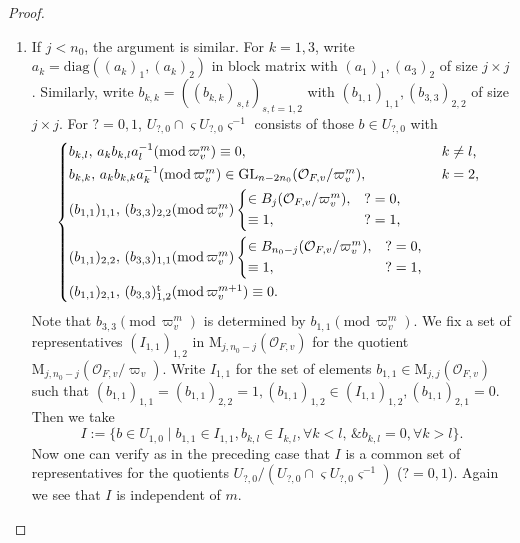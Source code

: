 \documentclass[10pt,a4paper]{amsart}
\begin{document}
\begin{proof}
\begin{enumerate}
			
			\item 
			If
			$j<n_0$,
			the argument is similar.
			For $k=1,3$,
			write
			$a_k=\mathrm{diag}((a_k)_1,(a_k)_2)$ in block matrix
			with
			$(a_1)_1,(a_3)_2$ of size $j\times j$.
			Similarly, write
			$b_{k,k}=((b_{k,k})_{s,t})_{s,t=1,2}$
			with
			$(b_{1,1})_{1,1},
			(b_{3,3})_{2,2}$ of size
			$j\times j$.
			For
			$?=0,1$,
			$U_{?,0}\cap
			\varsigma
			U_{?,0}\varsigma^{-1}$
			consists of those $b\in U_{?,0}$ with
			\[
			\begin{cases*}
				b_{k,l},\,
				a_kb_{k,l}a_l^{-1}		
				(\mathrm{mod}\,\varpi_v^m)
				\equiv
				0,
				&
				$k\neq l$,
				\\
				b_{k,k},\,
				a_kb_{k,k}a_k^{-1}
				(\mathrm{mod}\,\varpi_v^m)
				\in
				\mathrm{GL}_{n-2n_0}(\mathcal{O}_{F,v}/\varpi_v^m),
				&
				$k=2$,
				\\
				(b_{1,1})_{1,1},\,
				(b_{3,3})_{2,2}
				(\mathrm{mod}\,\varpi_v^m)
				\begin{cases*}
					\in
					B_j
					(\mathcal{O}_{F,v}/\varpi_v^m),
					&
					$?=0$,
					\\
					\equiv1,
					&
					$?=1$,
				\end{cases*}
				&
				\\
				(b_{1,1})_{2,2},\,
				(b_{3,3})_{1,1}
				(\mathrm{mod}\,\varpi_v^m)
				\begin{cases*}
					\in
					B_{n_0-j}
					(\mathcal{O}_{F,v}/\varpi_v^m),
					&
					$?=0$,
					\\
					\equiv1,
					&
					$?=1$,
				\end{cases*}
				\\
				(b_{1,1})_{2,1},\,
				(b_{3,3})_{1,2}^\mathrm{t}
				(\mathrm{mod}\,\varpi_v^{m+1})
				\equiv
				0.
				&
			\end{cases*}
			\]
			Note that
			$b_{3,3}
			(\mathrm{mod}\,\varpi_v^m)$
			is determined by
			$b_{1,1}
			(\mathrm{mod}\,\varpi_v^m)$.
			We fix a set of representatives
			$(I_{1,1})_{1,2}$
			in
			$\mathrm{M}_{j,n_0-j}
			(\mathcal{O}_{F,v})$
			for the quotient
			$\mathrm{M}_{j,n_0-j}
			(\mathcal{O}_{F,v}/\varpi_v)$.
			Write
			$I_{1,1}$
			for the set of elements
			$b_{1,1}\in
			\mathrm{M}_{j,j}(\mathcal{O}_{F,v})$
			such that
			$(b_{1,1})_{1,1}=(b_{1,1})_{2,2}=1,
			(b_{1,1})_{1,2}\in (I_{1,1})_{1,2},
			(b_{1,1})_{2,1}=0$.
			Then we take
			\begin{equation}\label{set of representatives-2}
				I:=
				\{
				b\in
				U_{1,0}\mid 
				b_{1,1}\in I_{1,1},
				b_{k,l}\in I_{k,l},
				\forall
				k<l,
				\,
				\&
				b_{k,l}=0,
				\forall
				k>l
				\}.
			\end{equation}
			Now one can verify as in the preceding case that
			$I$ is a common set of representatives for the quotients
			$U_{?,0}/
			(U_{?,0}\cap
			\varsigma U_{?,0}\varsigma^{-1})$
			($?=0,1$).
			Again we see that $I$ is independent of
			$m$.
		\end{enumerate}
	\end{proof}
\end{document}

